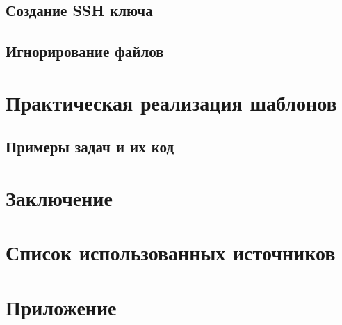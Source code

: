 \documentclass[oneside,final,14pt]{extarticle} %
\begin{document}
\subsection{Создание SSH ключа}

\newpage

\subsection{Игнорирование файлов}

\newpage

\section{Практическая реализация шаблонов}
\subsection{Примеры задач и их код}

\newpage

\section*{Заключение}

\newpage

\section*{Список использованных источников}
\setlength{\parindent}{0cm}

\newpage

\section*{Приложение}
\setlength{\parindent}{0cm}
\newpage

\appendix
\end{document}
